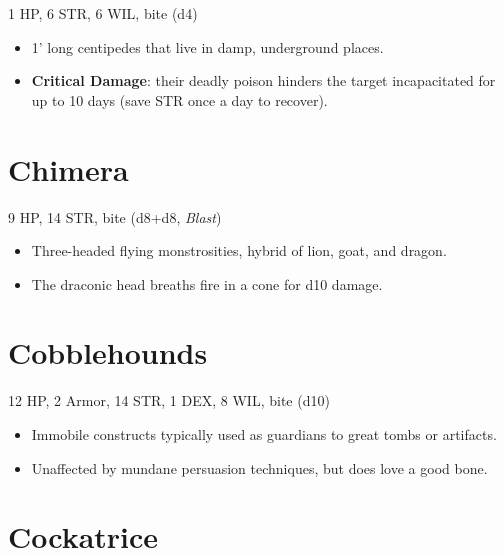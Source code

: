 \documentclass[
  10pt,
  american,
]{article}
\begin{document}
1 HP, 6 STR, 6 WIL, bite (d4)

\begin{samepage}
\begin{itemize}
\setlength\itemsep{-.5em}
\item 1’ long centipedes that live in damp, underground places.
\item \textbf{Critical Damage}: their deadly poison hinders the target incapacitated for up to 10 days (save STR once a day to recover).
\end{itemize}
\end{samepage}

\hypertarget{chimera}{%
\section{Chimera}\label{chimera}}

9 HP, 14 STR, bite (d8+d8, \emph{Blast})

\begin{samepage}
\begin{itemize}
\setlength\itemsep{-.5em}
\item Three-headed flying monstrosities, hybrid of lion, goat, and dragon.
\item The draconic head breaths fire in a cone for d10 damage.
\end{itemize}
\end{samepage}

\hypertarget{cobblehounds}{%
\section{Cobblehounds}\label{cobblehounds}}

12 HP, 2 Armor, 14 STR, 1 DEX, 8 WIL, bite (d10)

\begin{samepage}
\begin{itemize}
\setlength\itemsep{-.5em}
\item Immobile constructs typically used as guardians to great tombs or artifacts.
\item Unaffected by mundane persuasion techniques, but does love a good bone.
\end{itemize}
\end{samepage}

\hypertarget{cockatrice}{%
\section{Cockatrice}\label{cockatrice}}
\end{document}
